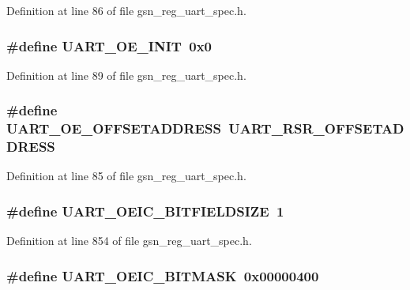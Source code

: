 Definition at line 86 of file gsn\_\-reg\_\-uart\_\-spec.h.

\hypertarget{a00575_abed3c421d4a8609fa1f9f70d3cc11917}{
\subsubsection[{UART\_\-OE\_\-INIT}]{\setlength{\rightskip}{0pt plus 5cm}\#define UART\_\-OE\_\-INIT~0x0}}
\label{a00575_abed3c421d4a8609fa1f9f70d3cc11917}


Definition at line 89 of file gsn\_\-reg\_\-uart\_\-spec.h.

\hypertarget{a00575_a1de9d021d17b31f871d2bcb618850f39}{
\subsubsection[{UART\_\-OE\_\-OFFSETADDRESS}]{\setlength{\rightskip}{0pt plus 5cm}\#define UART\_\-OE\_\-OFFSETADDRESS~UART\_\-RSR\_\-OFFSETADDRESS}}
\label{a00575_a1de9d021d17b31f871d2bcb618850f39}


Definition at line 85 of file gsn\_\-reg\_\-uart\_\-spec.h.

\hypertarget{a00575_acd134b85b067bdd13049d29c1185865b}{
\subsubsection[{UART\_\-OEIC\_\-BITFIELDSIZE}]{\setlength{\rightskip}{0pt plus 5cm}\#define UART\_\-OEIC\_\-BITFIELDSIZE~1}}
\label{a00575_acd134b85b067bdd13049d29c1185865b}


Definition at line 854 of file gsn\_\-reg\_\-uart\_\-spec.h.

\hypertarget{a00575_a568d1ed849a47facbeb5d209dbecd72b}{
\subsubsection[{UART\_\-OEIC\_\-BITMASK}]{\setlength{\rightskip}{0pt plus 5cm}\#define UART\_\-OEIC\_\-BITMASK~0x00000400}}
\label{a00575_a568d1ed849a47facbeb5d209dbecd72b}


